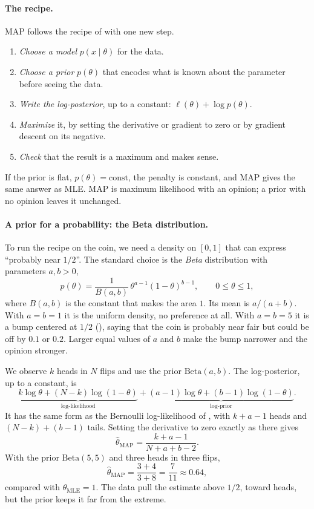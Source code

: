 \paragraph{The recipe.}
MAP follows the recipe of  with one new step.
\begin{enumerate}
  \item \emph{Choose a model} $p(x \mid \theta)$ for the data.
  \item \emph{Choose a prior} $p(\theta)$ that encodes what is known
    about the parameter before seeing the data.
  \item \emph{Write the log-posterior}, up to a constant: $\ell(\theta) +
    \log p(\theta)$.
  \item \emph{Maximize} it, by setting the derivative or gradient to zero
    or by gradient descent on its negative.
  \item \emph{Check} that the result is a maximum and makes sense.
\end{enumerate}
If the prior is flat, $p(\theta) = \text{const}$, the penalty is constant,
and MAP gives the same answer as MLE. MAP is maximum likelihood with an
opinion; a prior with no opinion leaves it unchanged.

\paragraph{A prior for a probability: the Beta distribution.}
To run the recipe on the coin, we need a density on $[0, 1]$ that can
express ``probably near $1/2$''. The standard choice is the \emph{Beta}
distribution with parameters $a, b > 0$,
\[
  p(\theta) = \frac{1}{B(a, b)}\, \theta^{a - 1} (1 - \theta)^{b - 1},
  \qquad 0 \le \theta \le 1 ,
\]
where $B(a, b)$ is the constant that makes the area $1$. Its mean is
$a/(a + b)$. With $a = b = 1$ it is the uniform density, no preference
at all. With $a = b = 5$ it is a bump centered at $1/2$
(), saying that the coin is probably near fair but
could be off by $0.1$ or $0.2$. Larger equal values of $a$ and $b$ make
the bump narrower and the opinion stronger.

\begin{example}
  \label{ex:ch06-map-coin}
  We observe $k$ heads in $N$ flips and use the prior $\text{Beta}(a,
  b)$. The log-posterior, up to a constant, is
  \[
    \underbrace{k\log\theta + (N - k)\log(1 - \theta)}_{\text{log-likelihood}}
    + \underbrace{(a - 1)\log\theta + (b - 1)\log(1 - \theta)}_{\text{log-prior}} .
  \]
  It has the same form as the Bernoulli log-likelihood of
  , with $k + a - 1$ heads and $(N - k) + (b
  - 1)$ tails. Setting the derivative to zero exactly as there gives
  \[
    \hat\theta_{\text{MAP}} = \frac{k + a - 1}{N + a + b - 2} .
  \]
  With the prior $\text{Beta}(5, 5)$ and three heads in three flips,
  \[
    \hat\theta_{\text{MAP}} = \frac{3 + 4}{3 + 8} = \frac{7}{11}
    \approx 0.64 ,
  \]
  compared with $\hat\theta_{\text{MLE}} = 1$. The data pull the estimate
  above $1/2$, toward heads, but the prior keeps it far from the
  extreme.
\end{example}

